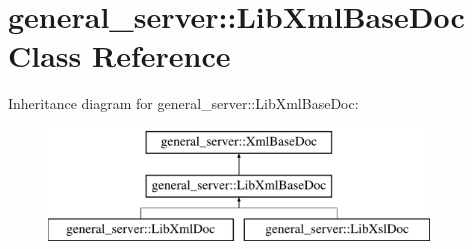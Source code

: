\hypertarget{classgeneral__server_1_1LibXmlBaseDoc}{\section{general\-\_\-server\-:\-:\-Lib\-Xml\-Base\-Doc \-Class \-Reference}
\label{classgeneral__server_1_1LibXmlBaseDoc}
}
\-Inheritance diagram for general\-\_\-server\-:\-:\-Lib\-Xml\-Base\-Doc\-:\begin{figure}[H]
\begin{center}
\leavevmode
\includegraphics[height=3.000000cm]{classgeneral__server_1_1LibXmlBaseDoc}
\end{center}
\end{figure}
